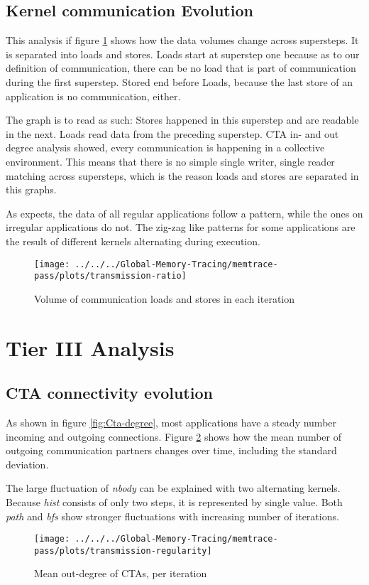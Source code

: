 \subsection{Kernel communication Evolution}
This analysis if figure \ref{trans-ratio} shows how the data volumes change across supersteps. It is separated into loads and stores. Loads start at superstep one because as to our definition of communication, there can be no load that is part
of communication during the first superstep. Stored end before Loads, because the last store of an application is no communication, either.

The graph is to read as such: Stores happened in this superstep and are readable in the next. Loads read data from the preceding superstep. CTA in- and out degree analysis showed, every communication is happening in a collective environment. This means that there is no simple single writer, single reader matching across supersteps, which is the reason loads and stores are separated in this graphs.

As expects, the data of all regular applications follow a pattern, while the ones on irregular applications do not. The zig-zag like patterns for some applications are the result of different kernels alternating during execution.
\begin{figure}[h!]
	\centering
	\texttt{[image: ../../../Global-Memory-Tracing/memtrace-pass/plots/transmission-ratio]}
	\caption{Volume of communication loads and stores in each iteration}
	\label{trans-ratio}
\end{figure}

\section{Tier III Analysis}
\subsection{CTA connectivity evolution}
As shown in figure \ref{fig:Cta-degree}, most applications have a steady number incoming and outgoing connections. Figure \ref{philandering} shows how the mean number of outgoing communication partners changes over time, including the standard deviation. 

The large fluctuation of \textit{nbody} can be explained with two alternating kernels. Because \textit{hist} consists of only two steps, it is represented by single value. Both \textit{path} and \textit{bfs} show stronger fluctuations with increasing number of iterations.

\begin{figure}[h!]
	\centering
		\texttt{[image: ../../../Global-Memory-Tracing/memtrace-pass/plots/transmission-regularity]}
	\caption{Mean out-degree of CTAs, per iteration}
	\label{philandering}
\end{figure}